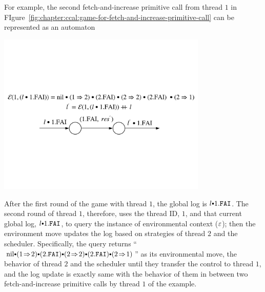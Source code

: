 For example, the second fetch-and-increase primitive call from thread $1$ in FIgure~\ref{fig:chapter:ccal:game-for-fetch-and-increase-primitive-call}
 can be represented as an automaton 
\begin{center}
\includegraphics[width=0.75\textwidth]{figs/ccal/faiexamplewithcontext}
\end{center}
After the first round of the game with thread $1$, the global log is $l \cons 1.\incticket$.  
The second round of thread $1$, therefore, uses the thread ID, $1$,  and that current global log, $l \cons 1.\incticket$, to query the instance of environmental context (${\varepsilon}$); then the environment move updates the log based on strategies of thread $2$ and the scheduler.
Specifically, the query returns ``$\nulllist \cons (1 \switch 2) \cons (2.\incticket) \cons (2 \switch 2) \cons (2.\incticket) \cons (2 \switch 1)$'' as its environmental move, 
the behavior of thread $2$ and the scheduler until they transfer the control to thread $1$,  and 
the log update is exactly same with the behavior of them in between two fetch-and-increase primitive calls by thread $1$ of the example.


